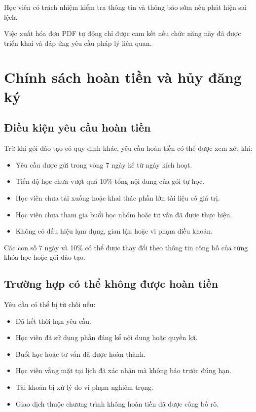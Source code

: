 \documentclass[12pt,a4paper]{article}
\begin{document}
Học viên có trách nhiệm kiểm tra thông tin và thông báo sớm nếu phát hiện sai lệch.

Việc xuất hóa đơn PDF tự động chỉ được cam kết nếu chức năng này đã được
triển khai và đáp ứng yêu cầu pháp lý liên quan.

\section{Chính sách hoàn tiền và hủy đăng ký}

\subsection{Điều kiện yêu cầu hoàn tiền}

Trừ khi gói đào tạo có quy định khác, yêu cầu hoàn tiền có thể được xem xét khi:

\begin{itemize}
    \item Yêu cầu được gửi trong vòng 7 ngày kể từ ngày kích hoạt.
    \item Tiến độ học chưa vượt quá 10\% tổng nội dung của gói tự học.
    \item Học viên chưa tải xuống hoặc khai thác phần lớn tài liệu có giá trị.
    \item Học viên chưa tham gia buổi học nhóm hoặc tư vấn đã được thực hiện.
    \item Không có dấu hiệu lạm dụng, gian lận hoặc vi phạm điều khoản.
\end{itemize}

Các con số 7 ngày và 10\% có thể được thay đổi theo thông tin công bố
của từng khóa học hoặc gói đào tạo.

\subsection{Trường hợp có thể không được hoàn tiền}

Yêu cầu có thể bị từ chối nếu:

\begin{itemize}
    \item Đã hết thời hạn yêu cầu.
    \item Học viên đã sử dụng phần đáng kể nội dung hoặc quyền lợi.
    \item Buổi học hoặc tư vấn đã được hoàn thành.
    \item Học viên vắng mặt tại lịch đã xác nhận mà không báo trước đúng hạn.
    \item Tài khoản bị xử lý do vi phạm nghiêm trọng.
    \item Giao dịch thuộc chương trình không hoàn tiền đã được công bố rõ.
\end{itemize}
\end{document}
